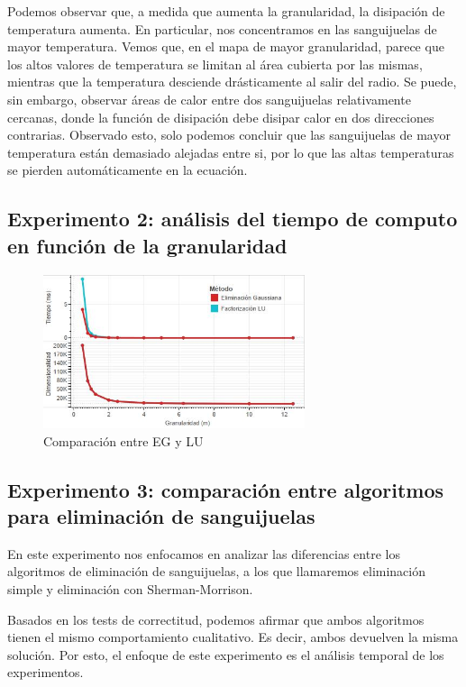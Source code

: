Podemos observar que, a medida que aumenta la granularidad, la disipación de temperatura aumenta. En particular, nos concentramos en las sanguijuelas de mayor temperatura. Vemos que, en el mapa de mayor granularidad, parece que los altos valores de temperatura se limitan al área cubierta por las mismas, mientras que la temperatura desciende drásticamente al salir del radio. Se puede, sin embargo, observar áreas de calor entre dos sanguijuelas relativamente cercanas, donde la función de disipación debe disipar calor en dos direcciones contrarias. Observado esto, solo podemos concluir que las sanguijuelas de mayor temperatura están demasiado alejadas entre si, por lo que las altas temperaturas se pierden automáticamente en la ecuación.


\subsection{Experimento 2: análisis del tiempo de computo en función de la granularidad}

\begin{figure}[H]
    \centering
    \includegraphics[width=0.685\textwidth]{experimento 2-1}
    \caption{Comparación entre EG y LU}
    \label{fig:exp21}
\end{figure}

\subsection{Experimento 3: comparación entre algoritmos para eliminación de sanguijuelas}%

En este experimento nos enfocamos en analizar las diferencias entre los algoritmos de eliminación de sanguijuelas, a los que llamaremos eliminación simple y eliminación con Sherman-Morrison.

Basados en los tests de correctitud, podemos afirmar que ambos algoritmos tienen el mismo comportamiento cualitativo. Es decir, ambos devuelven la misma solución. Por esto, el enfoque de este experimento es el análisis temporal de los experimentos. 

